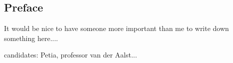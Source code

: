 


\chapter*{}


\section*{Preface}

It would be nice to have someone more important than me to write down something here....

candidates: Petia, professor van der Aalst...

